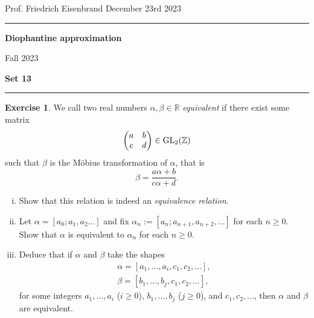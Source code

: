 \documentclass[12pt,a4paper]{article}
\date{}
\theoremstyle{plain}
\newtheorem*{Sol*}{Solution}
\theoremstyle{definition}
\newtheorem{Ex}{Exercise}
\def \R {\mathbb R}
\def \Z {\mathbb Z}
\newif\ifsolutions
\newcommand{\exercise}[2]{
			\begin{Ex} #1 \end{Ex}
			\ifsolutions  \begin{Sol*} #2 \end{Sol*} \bigskip \else \bigskip  \fi
		}
\begin{document}
\begin{center}
{Prof. Friedrich Eisenbrand \hfill December 23rd 2023}
\end{center}
	
\hrule\vspace{\baselineskip}

\begin{center}
\textbf{Diophantine approximation}

Fall 2023

\bigskip

\textbf{Set 13}
\ifsolutions{\textbf{- Solutions}} \else{} \fi
\end{center}

\hrule\vspace{\baselineskip}




\exercise{
	We call two real numbers $\alpha, \beta \in \R$ \emph{equivalent} if there exist some matrix
		\[ \begin{pmatrix} a & b \\ c & d \end{pmatrix} \in {\rm GL}_2(\Z) \]
	such that $\beta$ is the Möbius transformation of $\alpha$, that is
		\[ \beta = \frac{a \alpha + b}{c \alpha + d}. \]
	
	\begin{enumerate}[i)]
		\item Show that this relation is indeed an \emph{equivalence relation}.
		\item Let $\alpha = [a_0;a_1, a_2 \dots]$ and fix $\alpha_n := [a_n; a_{n+1}, a_{n+2}, \dots]$ for each $n \geq 0$.
		Show that $\alpha$ is equivalent to $\alpha_n$ for each $n \geq 0$.

		\item Deduce that if $\alpha$ and $\beta$ take the shapes
			\begin{gather*}
				\alpha = [a_1, \dots, a_i, c_1, c_2, \dots], \\
				\beta = [b_1, \dots, b_j, c_1, c_2, \dots],
			\end{gather*}
		for some integers $a_1, \dots, a_i$ ($i \geq 0$), $b_1, \dots, b_j$ ($j\geq0$), and $c_1, c_2, \dots$,
		then $\alpha$ and $\beta$ are equivalent.
	\end{enumerate}
}
{}
\end{document}
